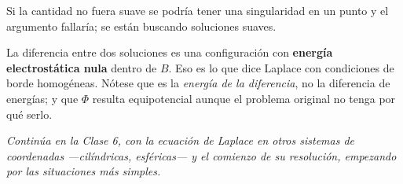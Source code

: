 \documentclass[12pt,a4paper]{article}
\begin{document}
\begin{warnbox}
Si la cantidad no fuera suave se podría tener una singularidad en un punto y el
argumento fallaría; se están buscando soluciones suaves.
\end{warnbox}

\begin{keybox}
La diferencia entre dos soluciones es una configuración con \textbf{energía
electrostática nula} dentro de $B$. Eso es lo que dice Laplace con condiciones de
borde homogéneas. Nótese que es la \emph{energía de la diferencia}, no la
diferencia de energías; y que $\Phi$ resulta equipotencial aunque el problema
original no tenga por qué serlo.
\end{keybox}

\bigskip
\noindent\emph{Continúa en la Clase 6, con la ecuación de Laplace en otros
sistemas de coordenadas ---cilíndricas, esféricas--- y el comienzo de su
resolución, empezando por las situaciones más simples.}
\end{document}
